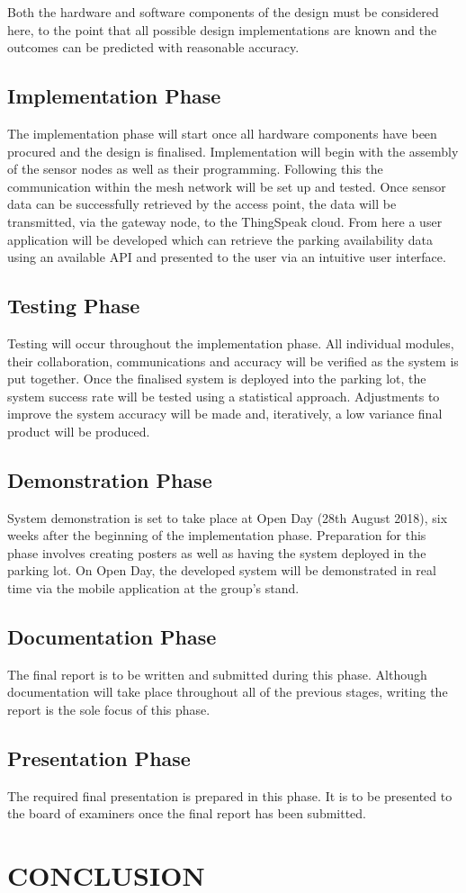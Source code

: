 \documentclass[10pt,twocolumn]{witseiepaper}
\begin{document}
		Both the hardware and software components of the design must be considered here, to the point that all possible design implementations are known and the outcomes can be predicted with reasonable accuracy. 
	
	\subsection{Implementation Phase}
		The implementation phase will start once all hardware components have been procured and the design is finalised. Implementation will begin with the assembly of the sensor nodes as well as their programming. Following this the communication within the mesh network will be set up and tested. Once sensor data can be successfully retrieved by the access point, the data will be transmitted, via the gateway node, to the ThingSpeak cloud. From here a user application will be developed which can retrieve the parking availability data using an available API and presented to the user via an intuitive user interface.
	
	\subsection{Testing Phase}
		Testing will occur throughout the implementation phase. All individual modules, their collaboration, communications and accuracy will be verified as the system is put together. Once the finalised system is deployed into the parking lot, the system success rate will be tested using a statistical approach. Adjustments to improve the system accuracy will be made and, iteratively, a low variance final product will be produced.
		
	\subsection{Demonstration Phase}
		System demonstration is set to take place at Open Day (28th August 2018), six weeks after the beginning of the implementation phase. Preparation for this phase involves creating posters as well as having the system deployed in the parking lot. On Open Day, the developed system will be demonstrated in real time via the mobile application at the group's stand.
	
	\subsection{Documentation Phase}
		The final report is to be written and submitted during this phase. Although documentation will take place throughout all of the previous stages, writing the report is the sole focus of this phase.
	
	\subsection{Presentation Phase}
		The required final presentation is prepared in this phase. It is to be presented to the board of examiners once the final report has been submitted.
	

\section{CONCLUSION}

{}

\end{document}
